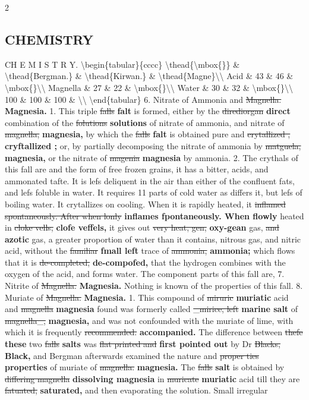 \documentclass[10pt]{article}
\begin{document}
\begin{multicols}{2}
\subsection*{CHEMISTRY}
CH E M I S T R Y. \textbackslash{}begin\{tabular\}\{cccc\} \textbackslash{}thead\{\textbackslash{}mbox\{\}\} \& \textbackslash{}thead\{Bergman.\} \& \textbackslash{}thead\{Kirwan.\} \& \textbackslash{}thead\{Magne\}\textbackslash{}\textbackslash{} Acid \& 43 \& 46 \& \textbackslash{}mbox\{\}\textbackslash{}\textbackslash{} Magnella \& 27 \& 22 \& \textbackslash{}mbox\{\}\textbackslash{}\textbackslash{} Water \& 30 \& 32 \& \textbackslash{}mbox\{\}\textbackslash{}\textbackslash{} 100 \& 100 \& 100 \& \textbackslash{}\textbackslash{} \textbackslash{}end\{tabular\} 6. Nitrate of Ammonia and \sout{Magnella.} \textbf{Magnesia.} 1. This triple \sout{falls} \textbf{falt} is formed, either by the \sout{dirediorgan} \textbf{direct} combination of the \sout{folutions} \textbf{solutions} of nitrate of ammonia, and nitrate of \sout{magnella,} \textbf{magnesia,} by which the \sout{falls} \textbf{falt} is obtained pure and \sout{crytallized ,} \textbf{cryftallized ;} or, by partially decomposing the nitrate of ammonia by \sout{matguela,} \textbf{magnesia,} or the nitrate of \sout{magenia} \textbf{magnesia} by ammonia. 2. The crythals of this fall are and the form of free frozen grains, it has a bitter, acids, and ammonated tafte. It is lefs deliquent in the air than either of the confluent fats, and lefs foluble in water. It requires 11 parts of cold water as differs it, but lefs of boiling water. It crytallizes on cooling. When it is rapidly heated, it \sout{inflamed spontaneously. After when lonly} \textbf{inflames fpontaneously. When flowly} heated in \sout{cloke vells,} \textbf{clofe veffels,} it gives out \sout{very heat, gen,} \textbf{oxy-gean} gas, \sout{and} \textbf{azotic} gas, a greater proportion of water than it contains, nitrous gas, and nitric acid, without the \sout{familiar} \textbf{fmall left} trace of \sout{ammonia,} \textbf{ammonia;} which flows that it is \sout{de-completed,} \textbf{de-compofed,} that the hydrogen combines with the oxygen of the acid, and forms water. The component parts of this fall are, 7. Nitrite of \sout{Magnella.} \textbf{Magnesia.} Nothing is known of the properties of this fall. 8. Muriate of \sout{Magnella.} \textbf{Magnesia.} 1. This compound of \sout{miruric} \textbf{muriatic} acid and \sout{magnella} \textbf{magnesia} found was formerly called \sout{\_mirice, left} \textbf{marine salt} of \sout{magnella\_,} \textbf{magnesia,} and was not confounded with the muriate of lime, with which it is frequently \sout{recommended.} \textbf{accompanied.} The difference between \sout{thefe} \textbf{these} two \sout{falls} \textbf{salts} was \sout{flat printed and} \textbf{first pointed out} by Dr \sout{Blacks,} \textbf{Black,} and Bergman afterwards examined the nature and \sout{proper ties} \textbf{properties} of muriate of \sout{magnella.} \textbf{magnesia.} The \sout{falls} \textbf{salt} is obtained by \sout{differing magnella} \textbf{dissolving magnesia} in \sout{muricate} \textbf{muriatic} acid till they are \sout{fatuated,} \textbf{saturated,} and then evaporating the solution. Small irregular 
\end{multicols}
\end{document}
